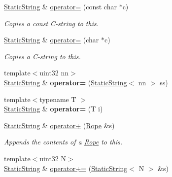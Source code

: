 \begin{DoxyCompactItemize}
\item 
\hypertarget{classetk_1_1_static_string_ae01ca97fe3e5c6ed095668266c62dea3}{\hyperlink{classetk_1_1_static_string}{Static\-String} \& \hyperlink{classetk_1_1_static_string_ae01ca97fe3e5c6ed095668266c62dea3}{operator=} (const char $\ast$c)}\label{classetk_1_1_static_string_ae01ca97fe3e5c6ed095668266c62dea3}

\begin{DoxyCompactList}\small\item\em Copies a const C-\/string to this. \end{DoxyCompactList}\item 
\hypertarget{classetk_1_1_static_string_a9d867b3fa673e549c7ec3e316432858e}{\hyperlink{classetk_1_1_static_string}{Static\-String} \& \hyperlink{classetk_1_1_static_string_a9d867b3fa673e549c7ec3e316432858e}{operator=} (char $\ast$c)}\label{classetk_1_1_static_string_a9d867b3fa673e549c7ec3e316432858e}

\begin{DoxyCompactList}\small\item\em Copies a C-\/string to this. \end{DoxyCompactList}\item 
\hypertarget{classetk_1_1_static_string_a61069b2faabd7c28cf36e29fbbf6fd42}{{\footnotesize template$<$uint32 nn$>$ }\\\hyperlink{classetk_1_1_static_string}{Static\-String} \& {\bfseries operator=} (\hyperlink{classetk_1_1_static_string}{Static\-String}$<$ nn $>$ ss)}\label{classetk_1_1_static_string_a61069b2faabd7c28cf36e29fbbf6fd42}

\item 
\hypertarget{classetk_1_1_static_string_abc80029dbca1e23cfed40b619ba23226}{{\footnotesize template$<$typename T $>$ }\\\hyperlink{classetk_1_1_static_string}{Static\-String} \& {\bfseries operator=} (T i)}\label{classetk_1_1_static_string_abc80029dbca1e23cfed40b619ba23226}

\item 
\hypertarget{classetk_1_1_static_string_a4360f55c0003eac4b2bfc4b536034df1}{\hyperlink{classetk_1_1_static_string}{Static\-String} \& \hyperlink{classetk_1_1_static_string_a4360f55c0003eac4b2bfc4b536034df1}{operator+} (\hyperlink{classetk_1_1_rope}{Rope} \&s)}\label{classetk_1_1_static_string_a4360f55c0003eac4b2bfc4b536034df1}

\begin{DoxyCompactList}\small\item\em Appends the contents of a \hyperlink{classetk_1_1_rope}{Rope} to this. \end{DoxyCompactList}\item 
\hypertarget{classetk_1_1_static_string_abb7639e5db2fadf0f75c11279d56c012}{{\footnotesize template$<$uint32 N$>$ }\\\hyperlink{classetk_1_1_static_string}{Static\-String} \& \hyperlink{classetk_1_1_static_string_abb7639e5db2fadf0f75c11279d56c012}{operator+=} (\hyperlink{classetk_1_1_static_string}{Static\-String}$<$ N $>$ \&s)}\label{classetk_1_1_static_string_abb7639e5db2fadf0f75c11279d56c012}


\end{DoxyCompactItemize}
